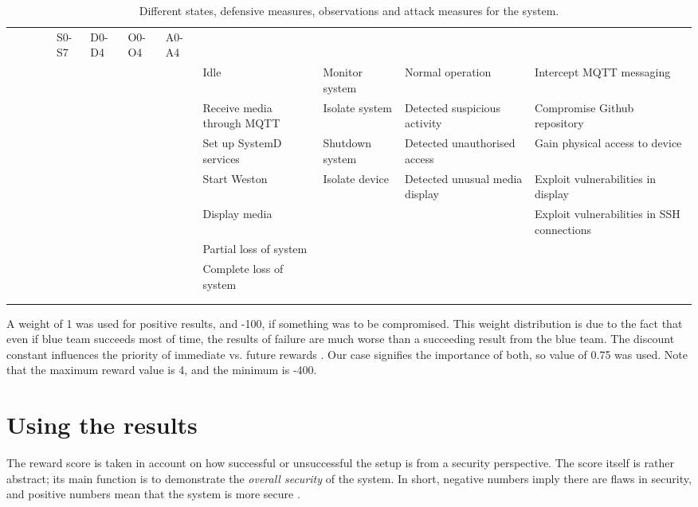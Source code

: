 \begin{landscape}
\begin{table}
\centering
\begin{tabular}{ |c|c|c|c| }
 \hline & & & & S0-S7 & D0-D4 & O0-O4 & A0-A4 \\ & & & & \hline \hline
 & & & & Idle & Monitor system & Normal operation & Intercept MQTT
 messaging \\ & & & & \hline & & & & Receive media through MQTT &
 Isolate system & Detected suspicious activity & Compromise Github
 repository \\ & & & & \hline & & & & Set up SystemD services &
 Shutdown system & Detected unauthorised access & Gain physical access
 to device \\ & & & & \hline & & & & Start Weston & Isolate device &
 Detected unusual media display & Exploit vulnerabilities in display
 \\ & & & & \hline & & & & Display media & & & Exploit vulnerabilities
 in SSH connections \\ & & & & \hline & & & & Partial loss of system &
 \ & \ & \\ & & & & \hline & & & & Complete loss of system & & & \\ &
 & & & \hline & & & & & & & \\ & & & & \hline

\end{tabular}
\caption{Different states, defensive measures, observations and attack
  measures for the system.}
\label{pomdbtable}
\end{table}
\end{landscape}

A weight of 1 was used for positive results, and -100, if something
was to be compromised. This weight distribution is due to the fact
that even if blue team succeeds most of time, the results of failure
are much worse than a succeeding result from the blue team. The
discount constant influences the priority of immediate
vs. future rewards \cite{mcabeeMarkov}. Our case signifies the
importance of both, so value of 0.75 was used. Note that the maximum
reward value is 4, and the minimum is -400.

\section{Using the results} \label{usingtheresults}

The reward score is taken in account on how
successful or unsuccessful the setup is from a security perspective. The
score itself is rather abstract; its main function is to demonstrate
the \textit{overall security} of the system. In short, negative
numbers imply there are flaws in security, and positive numbers mean
that the system is more secure
\cite{mcabeeMarkov}.

